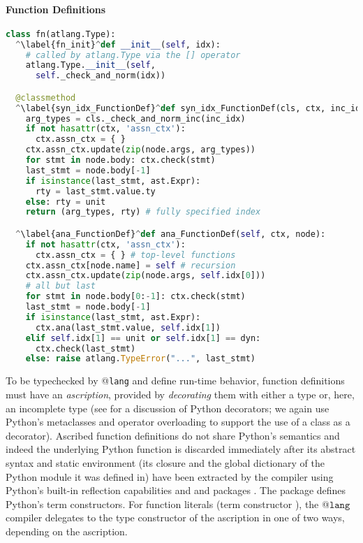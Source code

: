 \paragraph{Function Definitions}
\begin{codelisting}[t]
\begin{lstlisting}[language=Python]
class fn(atlang.Type):
  ^\label{fn_init}^def __init__(self, idx): 
    # called by atlang.Type via the [] operator 
    atlang.Type.__init__(self, 
      self._check_and_norm(idx))

  @classmethod
  ^\label{syn_idx_FunctionDef}^def syn_idx_FunctionDef(cls, ctx, inc_idx, node):
    arg_types = cls._check_and_norm_inc(inc_idx)
    if not hasattr(ctx, 'assn_ctx'): 
      ctx.assn_ctx = { }
    ctx.assn_ctx.update(zip(node.args, arg_types))
    for stmt in node.body: ctx.check(stmt)
    last_stmt = node.body[-1]
    if isinstance(last_stmt, ast.Expr): 
      rty = last_stmt.value.ty
    else: rty = unit
    return (arg_types, rty) # fully specified index

  ^\label{ana_FunctionDef}^def ana_FunctionDef(self, ctx, node):
    if not hasattr(ctx, 'assn_ctx'): 
      ctx.assn_ctx = { } # top-level functions
    ctx.assn_ctx[node.name] = self # recursion
    ctx.assn_ctx.update(zip(node.args, self.idx[0]))
    # all but last
    for stmt in node.body[0:-1]: ctx.check(stmt)
    last_stmt = node.body[-1]
    if isinstance(last_stmt, ast.Expr): 
      ctx.ana(last_stmt.value, self.idx[1])
    elif self.idx[1] == unit or self.idx[1] == dyn: 
      ctx.check(last_stmt)
    else: raise atlang.TypeError("...", last_stmt)
\end{lstlisting}
\caption{A portion of the type constructor \texttt{atlib.fn}.}
\label{fn-top}
\end{codelisting}
 To be typechecked by @\texttt{lang} and define run-time behavior, function definitions must have an \emph{ascription}, provided by \emph{decorating} them with either a type or, here, an incomplete type (see \cite{python} for a discussion of Python decorators; we again use Python's metaclasses and operator overloading to support the use of a class as a decorator). Ascribed function definitions do not share Python's semantics and indeed the underlying Python function is discarded immediately after its abstract syntax and static environment (its closure and the global dictionary of the Python module it was defined in) have been extracted by the compiler using Python's built-in reflection capabilities and  and  packages \cite{python}. The  package defines Python's term constructors. For function literals (term constructor ), the @$\texttt{lang}$ compiler delegates to the type constructor of the ascription in one of two ways, depending on the ascription.

